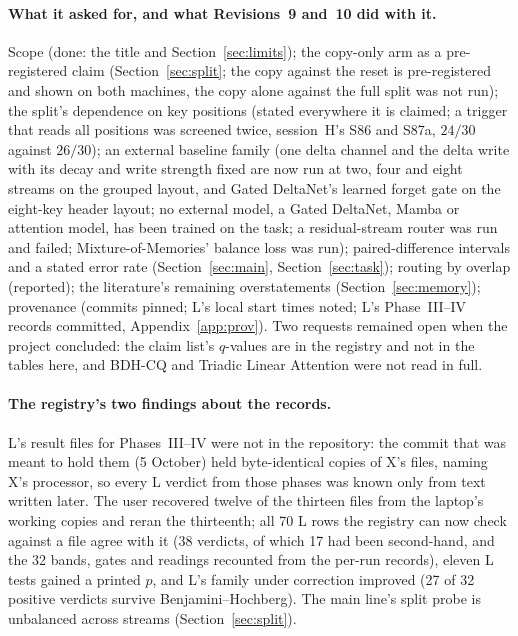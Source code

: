 \documentclass[11pt]{article}
\begin{document}
\paragraph{What it asked for, and what Revisions~9 and~10 did with it.} Scope (done: the title and Section~\ref{sec:limits}); the copy-only arm as a pre-registered claim (Section~\ref{sec:split}; the copy against the reset is pre-registered and shown on both machines, the copy alone against the full split was not run); the split's dependence on key positions (stated everywhere it is claimed; a trigger that reads all positions was screened twice, session~H's S86 and S87a, $24/30$ against $26/30$); an external baseline family (one delta channel and the delta write with its decay and write strength fixed are now run at two, four and eight streams on the grouped layout, and Gated DeltaNet's learned forget gate on the eight-key header layout; no external model, a Gated DeltaNet, Mamba or attention model, has been trained on the task; a residual-stream router was run and failed; Mixture-of-Memories' balance loss was run); paired-difference intervals and a stated error rate (Section~\ref{sec:main}, Section~\ref{sec:task}); routing by overlap (reported); the literature's remaining overstatements (Section~\ref{sec:memory}); provenance (commits pinned; L's local start times noted; L's Phase~III--IV records committed, Appendix~\ref{app:prov}). Two requests remained open when the project concluded: the claim list's $q$-values are in the registry and not in the tables here, and BDH-CQ and Triadic Linear Attention were not read in full.

\paragraph{The registry's two findings about the records.} L's result files for Phases~III--IV were not in the repository: the commit that was meant to hold them (5 October) held byte-identical copies of X's files, naming X's processor, so every L verdict from those phases was known only from text written later. The user recovered twelve of the thirteen files from the laptop's working copies and reran the thirteenth; all 70 L rows the registry can now check against a file agree with it (38 verdicts, of which 17 had been second-hand, and the 32 bands, gates and readings recounted from the per-run records), eleven L tests gained a printed $p$, and L's family under correction improved (27 of 32 positive verdicts survive Benjamini--Hochberg). The main line's split probe is unbalanced across streams (Section~\ref{sec:split}).
\end{document}
